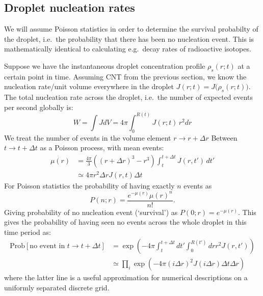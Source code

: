 \documentclass[11pt,twoside]{report}
\begin{document}
\subsection{Droplet nucleation rates}

We will assume Poisson statistics in order to determine the survival probabilty of the droplet, i.e.\ the probability that there has been no nucleation event.
This is mathematically identical to calculating e.g.\ decay rates of radioactive isotopes.

Suppose we have the instantaneous droplet concentration profile $\rho_s(r; t)$ at a certain point in time.
Assuming CNT from the previous section, we know the nucleation rate/unit volume everywhere in the droplet $J(r; t) = J\Big(\rho_s(r; t)\Big)$.
The total nucleation rate across the droplet, i.e.\ the number of expected events per second globally is:
\begin{equation}
  W = \int J dV
  = 4\pi \int_0^{R(t)} J(r; t) \, r^2 dr
\end{equation}
We treat the number of events in the volume element $r \to r + \Delta r$ Between $t \to t+\Delta t$ as a Poisson process, with mean events:
\begin{equation}
  \begin{aligned}
    \mu(r) &= \frac{4\pi}{3} \left( (r+\Delta r)^3 - r^3 \right)
    \int_t^{t+\Delta t} J(r,t') \, dt' \\
    &\simeq
    4\pi r^2 \Delta r J(r, t) \Delta t
  \end{aligned}
\end{equation}
For Poisson statistics the probability of having exactly $n$ events as
\begin{equation}
  P(n; r) = \frac{e^{-\mu(r)} \mu(r)^n}{n!}.
\end{equation}
Giving probability of no nucleation event (`survival') as $P(0; r) = e^{-\mu(r)}$.
This gives the probability of having seen no events across the whole droplet in this time period as:
\begin{equation}
  \begin{aligned}
    \textrm{Prob}\left[ \textrm{no event in } t \to t + \Delta t \right]
    &=
    \exp{\left(
      -4\pi \int_t^{t+\Delta t} dt' \int_0^{R(t')} dr r^2 J(r, t')
      \right)}
    \\ &\simeq
    \prod_i \exp{\left(-4\pi (i\Delta r)^2 J(i\Delta r) \Delta t \Delta r\right)}
  \end{aligned}
\end{equation}
where the latter line is a useful approximation for numerical descriptions on a uniformly separated discrete grid.
\end{document}
